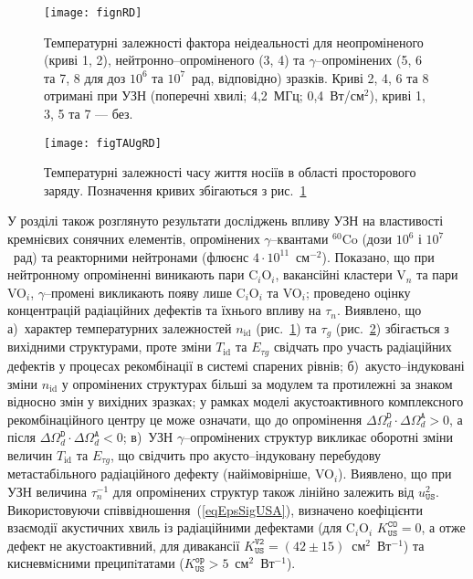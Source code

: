 \begin{figure}[ht]
\center
\texttt{[image: fignRD]}%
\caption{\label{fignRD}
Температурні залежності фактора неідеальності
для неопроміненого (криві 1, 2),
нейтронно--опроміненого (3, 4) та
$\gamma$--опромінених (5, 6 та 7, 8 для доз $10^6$ та $10^7$~рад, відповідно)
зразків.
Криві 2, 4, 6 та 8 отримані при УЗН (поперечні хвилі; 4,2~МГц; 0,4~Вт/см$^2$),
криві 1, 3, 5 та 7 --- без.
}%
\end{figure}


\begin{figure}[b]
\center
\texttt{[image: figTAUgRD]}%
\caption{\label{figTAUgRD}
Температурні залежності часу життя носіїв в області просторового заряду.
Позначення кривих збігаються з рис.~\ref{fignRD}
}%
\end{figure}


У розділі також розглянуто результати досліджень впливу УЗН на властивості кремнієвих сонячних елементів,
опромінених $\gamma$--квантами $^{60}$Co (дози $10^6$ і $10^7$~рад) та реакторними нейтронами (флюєнс $4\cdot10^{11}$~см$^{-2}$).
Показано, що при нейтронному опроміненні виникають пари C$_i$O$_i$,
вакансійні кластери V$_n$ та пари VO$_i$, $\gamma$--промені викликають появу лише C$_i$O$_i$ та VO$_i$;
проведено оцінку концентрацій радіаційних дефектів та їхнього впливу на $\tau_n$.
Виявлено, що
а)~характер температурних залежностей  $n_\mathrm{id}$ (рис.~\ref{fignRD}) та $\tau_{g}$ (рис.~\ref{figTAUgRD})
збігається з вихідними структурами, проте зміни $T_{\mathrm{id}}$ та $E_{\tau g}$ свідчать про участь радіаційних дефектів у процесах рекомбінації в системі спарених рівнів;
б)~акусто--індуковані зміни $n_\mathrm{id}$ у опромінених структурах більші за модулем та протилежні за знаком відносно змін у вихідних зразках;
у рамках моделі акустоактивного комплексного рекомбінаційного центру це може означати, що до опромінення $\Delta\Omega_d^\mathtt{D}\cdot\Delta\Omega_d^\mathtt{A}>0$, а після $\Delta\Omega_d^\mathtt{D}\cdot\Delta\Omega_d^\mathtt{A}<0$;
в)~УЗН $\gamma$--опромінених структур викликає оборотні зміни величин $T_{\mathrm{id}}$ та $E_{\tau g}$,
що свідчить про акусто--індуковану перебудову метастабільного радіаційного дефекту (найімовірніше, VO$_i$).
Виявлено, що при УЗН величина $\tau_n^{-1}$ для опромінених структур також лінійно залежить від $u_{\mathtt{US}}^2$.
Використовуючи співвідношення~(\ref{eqEpsSigUSA}), визначено коефіцієнти взаємодії акустичних хвиль із радіаційними дефектами (для C$_i$O$_i$ $K_\mathtt{US}^\mathtt{CO}=0$, а отже дефект не акустоактивний,
для дивакансії $K_\mathtt{US}^\mathtt{V2}=(42\pm15)$~см$^2$~Вт$^{-1}$)
та кисневмiсними преципiтатами ($K_\mathtt{US}^\mathtt{op}>5$~см$^2$~Вт$^{-1}$).


